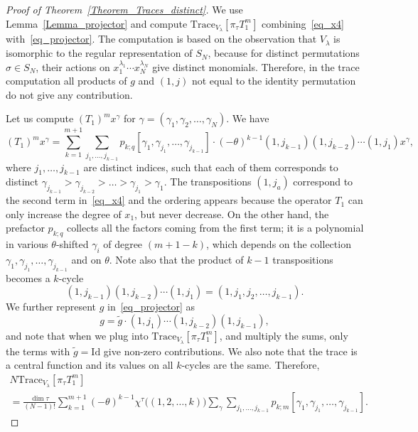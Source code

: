 \begin{proof}[Proof of Theorem~\ref{Theorem_Traces_distinct}] We use Lemma~\ref{Lemma_projector} and compute $\mathrm{Trace}_{V_\lambda} \left[\pi_\tau T_1^m\right]$ combining~\eqref{eq_x4} with~\eqref{eq_projector}. The computation is based on the observation that $V_\lambda$ is isomorphic to the regular representation of $S_N$, because for distinct permutations $\sigma\in S_N$, their actions on $x_1^{\lambda_1}\cdots x_N^{\lambda_N}$ give distinct monomials. Therefore, in the trace computation all products of $g$ and $(1,j)$ not equal to the identity permutation do not give any contribution.

Let us compute $(T_1)^m x^{\gamma}$ for $\gamma=(\gamma_1,\gamma_2,\dots,\gamma_N)$.
We have
\begin{equation}
\label{eq_x5}
 (T_1)^m x^{\gamma}=\sum_{k=1}^{m+1}\sum_{j_1,\dots,j_{k-1}} p_{k;q}[\gamma_1,\gamma_{j_1},\dots,\gamma_{j_{k-1}}]\cdot  (-\theta)^{k-1}(1,j_{k-1})(1, j_{k-2})\cdots (1,j_{1}) x^{\gamma},
\end{equation}
where $j_1,\dots,j_{k-1}$ are distinct indices, such that each of them corresponds to distinct $\gamma_{j_{k-1}}>\gamma_{j_{k-2}}>\dots>\gamma_{j_1}>\gamma_1$. The transpositions $(1,j_a)$ correspond to the second term in~\eqref{eq_x4} and the ordering appears because the operator $T_1$ can only increase the degree of $x_1$, but never decrease. On the other hand, the prefactor $p_{k;q}$ collects all the factors coming from the first term; it is a polynomial in various $\theta$-shifted $\gamma_i$ of degree $(m+1-k)$, which depends on the collection $\gamma_1, \gamma_{j_1},\dots,\gamma_{j_{k-1}}$ and on $\theta$. Note also that the product of $k-1$ transpositions becomes a $k$-cycle
$$
 (1,j_{k-1})(1, j_{k-2})\cdots (1,j_{1})=(1, j_{1}, j_{2},\dots, j_{k-1}).
$$
We further represent $g$ in~\eqref{eq_projector} as
$$
 g=\tilde g\cdot  (1,j_1)  \cdots (1,j_{k-2})(1, j_{k-1}),
$$
and note that when we plug into $\mathrm{Trace}_{V_\lambda} \left[\pi_\tau T_1^m\right]$, and multiply the sums, only the terms with $\tilde g=\mathrm{Id}$ give non-zero contributions.
We also note that the trace is a central function and its values on all $k$-cycles are the same. Therefore,
\begin{multline}
\label{eq_x6}
 N \mathrm{Trace}_{V_\lambda} \left[\pi_\tau T_1^m\right]\\ = \frac{\dim \tau}{(N-1)!}  \sum_{k=1}^{m+1} (-\theta)^{k-1} \chi^\tau\bigl( (1,2,\dots,k) \bigr)
 \sum_{\gamma}  \sum_{j_1,\dots,j_{k-1}} p_{k;m}[\gamma_1,\gamma_{j_1},\dots,\gamma_{j_{k-1}}].

\end{multline}
\end{proof}
